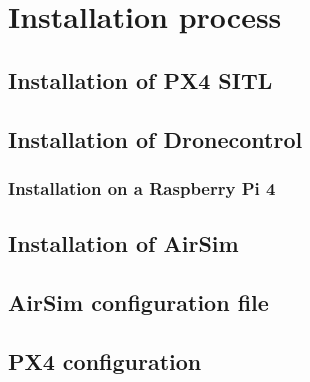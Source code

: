 \chapter{Installation process}
\section{Installation of PX4 SITL}
\label{app:install-px4}
\section{Installation of Dronecontrol}
\label{app:install-dronecontrol}
\subsection{Installation on a Raspberry Pi 4}
\label{app:install-dronecontrol-rpi}
\section{Installation of AirSim}
\label{app:install-airsim}
\section{AirSim configuration file}
\label{app:airsim-config}
\section{PX4 configuration}
